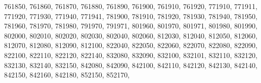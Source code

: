 \textquotesingle{}761850\textquotesingle{}, \textquotesingle{}761860\textquotesingle{}, \textquotesingle{}761870\textquotesingle{}, \textquotesingle{}761880\textquotesingle{}, \textquotesingle{}761890\textquotesingle{}, \textquotesingle{}761900\textquotesingle{}, \textquotesingle{}761910\textquotesingle{}, \textquotesingle{}761920\textquotesingle{}, \textquotesingle{}771910\textquotesingle{}, \textquotesingle{}771911\textquotesingle{}, \textquotesingle{}771920\textquotesingle{}, \textquotesingle{}771930\textquotesingle{}, \textquotesingle{}771940\textquotesingle{}, \textquotesingle{}771941\textquotesingle{}, \textquotesingle{}781900\textquotesingle{}, \textquotesingle{}781910\textquotesingle{}, \textquotesingle{}781920\textquotesingle{}, \textquotesingle{}781930\textquotesingle{}, \textquotesingle{}781940\textquotesingle{}, \textquotesingle{}781950\textquotesingle{}, \textquotesingle{}781960\textquotesingle{}, \textquotesingle{}781970\textquotesingle{}, \textquotesingle{}781980\textquotesingle{}, \textquotesingle{}791970\textquotesingle{}, \textquotesingle{}791971\textquotesingle{}, \textquotesingle{}801960\textquotesingle{}, \textquotesingle{}801970\textquotesingle{}, \textquotesingle{}801971\textquotesingle{}, \textquotesingle{}801980\textquotesingle{}, \textquotesingle{}801990\textquotesingle{}, \textquotesingle{}802000\textquotesingle{}, \textquotesingle{}802010\textquotesingle{}, \textquotesingle{}802020\textquotesingle{}, \textquotesingle{}802030\textquotesingle{}, \textquotesingle{}802040\textquotesingle{}, \textquotesingle{}802060\textquotesingle{}, \textquotesingle{}812030\textquotesingle{}, \textquotesingle{}812040\textquotesingle{}, \textquotesingle{}812050\textquotesingle{}, \textquotesingle{}812060\textquotesingle{}, \textquotesingle{}812070\textquotesingle{}, \textquotesingle{}812080\textquotesingle{}, \textquotesingle{}812090\textquotesingle{}, \textquotesingle{}812100\textquotesingle{}, \textquotesingle{}822040\textquotesingle{}, \textquotesingle{}822050\textquotesingle{}, \textquotesingle{}822060\textquotesingle{}, \textquotesingle{}822070\textquotesingle{}, \textquotesingle{}822080\textquotesingle{}, \textquotesingle{}822090\textquotesingle{}, \textquotesingle{}822100\textquotesingle{}, \textquotesingle{}822110\textquotesingle{}, \textquotesingle{}822120\textquotesingle{}, \textquotesingle{}822140\textquotesingle{}, \textquotesingle{}832080\textquotesingle{}, \textquotesingle{}832090\textquotesingle{}, \textquotesingle{}832100\textquotesingle{}, \textquotesingle{}832101\textquotesingle{}, \textquotesingle{}832110\textquotesingle{}, \textquotesingle{}832120\textquotesingle{}, \textquotesingle{}832130\textquotesingle{}, \textquotesingle{}832140\textquotesingle{}, \textquotesingle{}832150\textquotesingle{}, \textquotesingle{}842080\textquotesingle{}, \textquotesingle{}842090\textquotesingle{}, \textquotesingle{}842100\textquotesingle{}, \textquotesingle{}842110\textquotesingle{}, \textquotesingle{}842120\textquotesingle{}, \textquotesingle{}842130\textquotesingle{}, \textquotesingle{}842140\textquotesingle{}, \textquotesingle{}842150\textquotesingle{}, \textquotesingle{}842160\textquotesingle{}, \textquotesingle{}842180\textquotesingle{}, \textquotesingle{}852150\textquotesingle{}, \textquotesingle{}852170\textquotesingle{}, 
